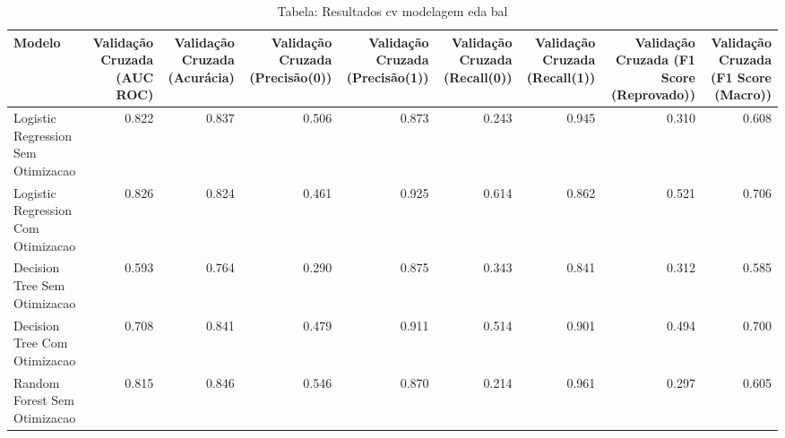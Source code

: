 \begin{table}[H] %
    \centering
    \caption{Tabela: Resultados cv modelagem eda bal}
    \label{tab:resultados_cv_modelagem_eda_bal}
    \renewcommand{\arraystretch}{1.25} %
    \begin{adjustwidth}{ -1in }{ -1in } %
    \centering %
    \small %
    \begin{tabular}{lrrrrrrrr}
\toprule
                            Modelo &  Validação Cruzada (AUC ROC) &  Validação Cruzada (Acurácia) &  Validação Cruzada (Precisão(0)) &  Validação Cruzada (Precisão(1)) &  Validação Cruzada (Recall(0)) &  Validação Cruzada (Recall(1)) &  Validação Cruzada (F1 Score (Reprovado)) &  Validação Cruzada (F1 Score (Macro)) \\
\midrule
Logistic Regression Sem Otimizacao &                        0.822 &                         0.837 &                            0.506 &                            0.873 &                          0.243 &                          0.945 &                                     0.310 &                                 0.608 \\
Logistic Regression Com Otimizacao &                        0.826 &                         0.824 &                            0.461 &                            0.925 &                          0.614 &                          0.862 &                                     0.521 &                                 0.706 \\
      Decision Tree Sem Otimizacao &                        0.593 &                         0.764 &                            0.290 &                            0.875 &                          0.343 &                          0.841 &                                     0.312 &                                 0.585 \\
      Decision Tree Com Otimizacao &                        0.708 &                         0.841 &                            0.479 &                            0.911 &                          0.514 &                          0.901 &                                     0.494 &                                 0.700 \\
      Random Forest Sem Otimizacao &                        0.815 &                         0.846 &                            0.546 &                            0.870 &                          0.214 &                          0.961 &                                     0.297 &                                 0.605 \\

\end{tabular}
\end{adjustwidth}
\end{table}
